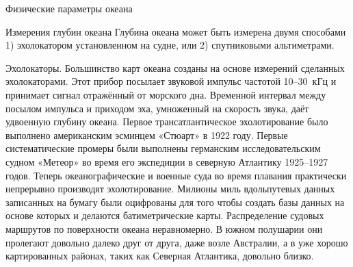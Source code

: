 \begin{chapter}{Физические параметры океана}
\begin{section}{Измерения глубин океана}
Глубина океана может быть измерена двумя способами 1) эхолокатором
установленном на судне, или 2) спутниковыми альтиметрами.

\begin{subsection}{Эхолокаторы.}
Большинство карт океана созданы на основе измерений сделанных
эхолокаторами. Этот прибор посылает звуковой импульс частотой
10--30~кГц и принимает сигнал отражённый от морского дна. Временной
интервал между посылом импульса и приходом эха, умноженный на скорость
звука, даёт удвоенную глубину океана. Первое трансатлантическое
эхолотирование было выполнено американским эсминцем «Стюарт» в 1922
году. Первые систематические промеры были выполнены германским
исследовательским судном «Метеор» во время его экспедиции в северную
Атлантику 1925--1927 годов. Теперь океанографические и военные суда
во время плавания практически непрерывно производят
эхолотирование. Милионы миль вдольпутевых данных записанных на бумагу
были оцифрованы для того чтобы создать базы данных на основе которых и
делаются батиметрические карты. Распределение судовых маршрутов по
поверхности океана неравномерно. В южном полушарии они пролегают
довольно далеко друг от друга, даже возле Австралии, а в уже хорошо
картированных районах, таких как Северная Атлантика, довольно близко.
%
%


\end{subsection}
\end{section}
\end{chapter}
